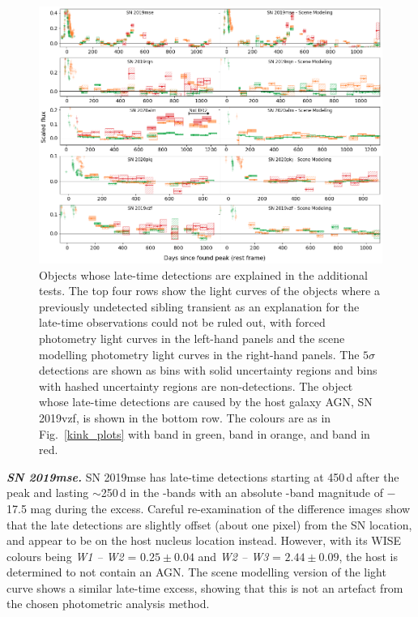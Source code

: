 \documentclass[a4paper,oneside,12pt, class=Latex/Classes/PhDthesisPSnPDF, crop=false]{standalone}
\begin{document}
\begin{figure}
 \centering
 \includegraphics[width=\textwidth]{../Images/chapter_3/other_alt_plots.png}
 \caption{Objects whose late-time detections are explained in the additional tests. The top four rows show the light curves of the objects where a previously undetected sibling transient as an explanation for the late-time observations could not be ruled out, with forced photometry light curves in the left-hand panels and the scene modelling photometry light curves in the right-hand panels. The $5\sigma$ detections are shown as bins with solid uncertainty regions and bins with hashed uncertainty regions are non-detections. The object whose late-time detections are caused by the host galaxy AGN, SN 2019vzf, is shown in the bottom row. The colours are as in Fig.~\ref{kink_plots} with \ztfg band in green, \ztfr band in orange, and \ztfi band in red.}
 \label{other_alt}
\end{figure}

\textit{\textbf{SN 2019mse.}}
SN 2019mse has late-time detections starting at 450\,d after the peak and lasting $\sim$250\,d in the \ztfg\ztfr\ztfi-bands with an absolute \ztfr-band magnitude of $-$17.5 mag during the excess. Careful re-examination of the difference images show that the late detections are slightly offset (about one pixel) from the SN location, and appear to be on the host nucleus location instead. However, with its WISE colours being \textit{W1 -- W2} = $0.25\pm0.04$ and \textit{W2 -- W3} = $2.44\pm0.09$, the host is determined to not contain an AGN. The scene modelling version of the light curve shows a similar late-time excess, showing that this is not an artefact from the chosen photometric analysis method. 
\end{document}
